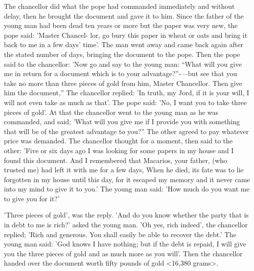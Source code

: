 The chancellor did what the pope had commanded immediately
and without delay, then he brought the document and gave it to
him.
Since the father of the young man had been dead ten years or
more but the paper was very new, the pope said: 'Master Chancel-
lor, go bury this paper in wheat or oats and bring it back to me in
a few days' time'.
The man went away and came back again after
the stated number of days, bringing the document to the pope.
Then
the pope said to the chancellor: 'Now go and say to the young man:
“What will you give me in return for a document which is to your
advantage?”-—but see that you take no more than three pieces of
gold from him, Master Chancellor.
Then give him the document,”
The chancellor replied: 'In truth, my Jord, if it is your will, I will not
even take as much as that'.
The pope said: 'No, I want you to take
three pieces of gold'.
At that the chancellor went to the young man
as he was commanded, and said; 'What will you give me if I provide
you with something that will be of the greatest advantage to you?”
The other agreed to pay whatever price was demanded.
The
chancellor thought for a moment, then said to the other: 'Five or six
days ago I was looking for some papers in my house and I found
this document.
And I remembered that Macarios, your father, (who
trusted me) had left it with me for a few days, When he died, its
fate was to lie forgotten in my house until this day, for it escaped
my memory and it never came into my mind to give it to you.' The
young man said: 'How much do you want me to give you for it?'

'Three pieces of gold', was the reply.
'And do you know whether the
party that is in debt to me is rich?' asked the young man.
'Oh yes,
rich indeed', the chancellor replied; 'Rich and generous.
You shall
easily be able to recover the debt.' The young man said: 'God
knows I have nothing; but if the debt is repaid, I will give you the
three pieces of gold and as much more as you will'.
Then the
chancellor handed over the document worth fifty pounds of gold
<16,380 grams>.

